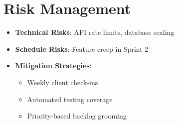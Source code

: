 \section{Risk Management}
\begin{itemize}
    \item \textbf{Technical Risks}: API rate limits, database scaling
    \item \textbf{Schedule Risks}: Feature creep in Sprint 2
    \item \textbf{Mitigation Strategies}:
        \begin{itemize}
            \item Weekly client check-ins
            \item Automated testing coverage
            \item Priority-based backlog grooming
        \end{itemize}
\end{itemize}